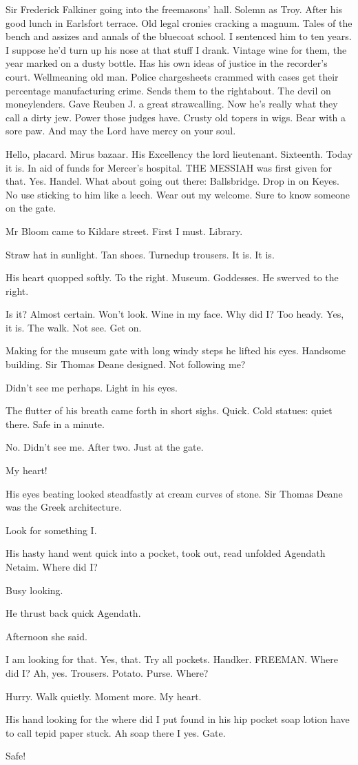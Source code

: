 Sir Frederick Falkiner going into the freemasons' hall.
Solemn as Troy.
After his good lunch in Earlsfort terrace.
Old legal cronies cracking a
magnum.
Tales of the bench and assizes and annals of the bluecoat school.
I sentenced him to ten years.
I suppose he'd turn up his nose at that
stuff I drank.
Vintage wine for them,
the year marked on a dusty bottle.
Has his own ideas of justice in the recorder's court.
Wellmeaning old
man.
Police chargesheets crammed with cases get their percentage
manufacturing crime.
Sends them to the rightabout.
The devil on
moneylenders.
Gave Reuben J.
a great strawcalling.
Now he's really what
they call a dirty jew.
Power those judges have.
Crusty old topers in
wigs.
Bear with a sore paw.
And may the Lord have mercy on your soul.

Hello,
placard.
Mirus bazaar.
His Excellency the lord lieutenant.
Sixteenth.
Today it is.
In aid of funds for Mercer's hospital.
THE
MESSIAH was first given for that.
Yes.
Handel.
What about going out
there:
Ballsbridge.
Drop in on Keyes.
No use sticking to him like a
leech.
Wear out my welcome.
Sure to know someone on the gate.

Mr Bloom came to Kildare street.
First I must.
Library.

Straw hat in sunlight.
Tan shoes.
Turnedup trousers.
It is.
It is.

His heart quopped softly.
To the right.
Museum.
Goddesses.
He swerved to
the right.

Is it?
Almost certain.
Won't look.
Wine in my face.
Why did I?
Too heady.
Yes,
it is.
The walk.
Not see.
Get on.

Making for the museum gate with long windy steps he lifted his eyes.
Handsome building.
Sir Thomas Deane designed.
Not following me?

Didn't see me perhaps.
Light in his eyes.

The flutter of his breath came forth in short sighs.
Quick.
Cold statues:
quiet there.
Safe in a minute.

No.
Didn't see me.
After two.
Just at the gate.

My heart!

His eyes beating looked steadfastly at cream curves of stone.
Sir Thomas
Deane was the Greek architecture.

Look for something I.

His hasty hand went quick into a pocket,
took out,
read unfolded Agendath
Netaim.
Where did I?

Busy looking.

He thrust back quick Agendath.

Afternoon she said.

I am looking for that.
Yes,
that.
Try all pockets.
Handker.
FREEMAN.
Where did I?
Ah,
yes.
Trousers.
Potato.
Purse.
Where?

Hurry.
Walk quietly.
Moment more.
My heart.

His hand looking for the where did I put found in his hip pocket soap
lotion have to call tepid paper stuck.
Ah soap there I yes.
Gate.

Safe!


